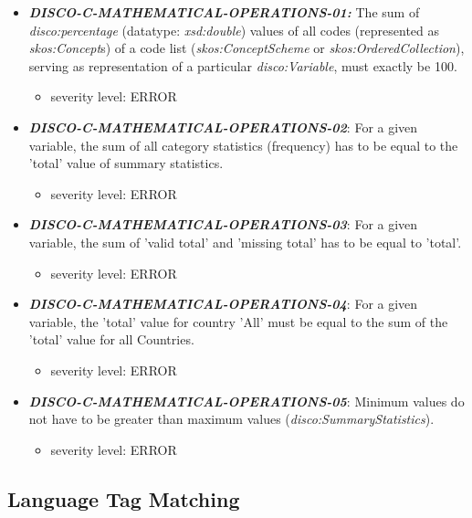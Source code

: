 \documentclass{llncs}
\begin{document}
\begin{itemize}
	\item \textbf{{\em DISCO-C-MATHEMATICAL-OPERATIONS-01:}}
  The sum of {\em disco:percentage} (datatype: {\em xsd:double}) values of all codes (represented as {\em skos:Concept}s) of a code list ({\em skos:ConceptScheme} or {\em skos:OrderedCollection}), serving as representation of a particular {\em disco:Variable}, must exactly be 100.
	\begin{itemize}
		\item severity level: ERROR
	\end{itemize}

	\item \textbf{{\em DISCO-C-MATHEMATICAL-OPERATIONS-02}}:
	For a given variable, the sum of all category statistics (frequency) has to be equal to the 'total' value of summary statistics.
	\begin{itemize}
		\item severity level: ERROR
	\end{itemize}
	
	\item \textbf{{\em DISCO-C-MATHEMATICAL-OPERATIONS-03}}:
	For a given variable, the sum of 'valid total' and 'missing total' has to be equal to 'total'.
	\begin{itemize}
		\item severity level: ERROR
	\end{itemize}
	
	\item \textbf{{\em DISCO-C-MATHEMATICAL-OPERATIONS-04}}:
	For a given variable, the 'total' value for country 'All' must be equal to the sum of the 'total' value for all Countries.
	\begin{itemize}
		\item severity level: ERROR
	\end{itemize}
	
	\item \textbf{{\em DISCO-C-MATHEMATICAL-OPERATIONS-05}}:
	Minimum values do not have to be greater than maximum values (\emph{disco:SummaryStatistics}).
	\begin{itemize}
		\item severity level: ERROR
	\end{itemize}

\end{itemize}

\subsection{Language Tag Matching}
\end{document}
